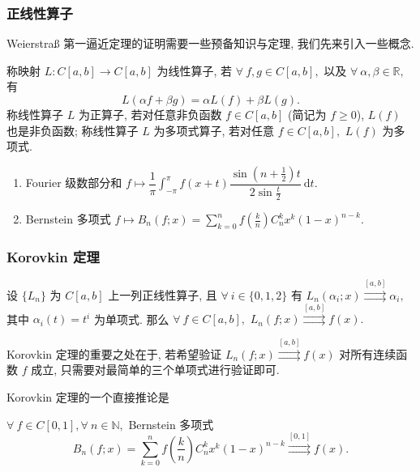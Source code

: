 \begin{frame}
\frametitle{正线性算子}

Weierstraß 第一逼近定理的证明需要一些预备知识与定理, 我们先来引入一些概念.

\pause

\begin{Def}
称映射 $L: C[a,b] \rightarrow C[a,b]$ 为线性算子, 若 $\forall ~ f, g \in C[a,b],$ 以及 $\forall ~ \alpha, \beta \in \mathbb{R},$ 有
\[L(\alpha f + \beta g) = \alpha L(f) + \beta L(g).\]
称线性算子 $L$ 为正算子, 若对任意非负函数 $f \in C[a, b]$ (简记为 $f \geqslant 0$), $L(f)$ 也是非负函数; 称线性算子 $L$ 为多项式算子, 若对任意 $f \in C[a, b],$ $L(f)$ 为多项式.
\end{Def}

\pause

\begin{eg}
\begin{enumerate}
\item Fourier 级数部分和 $\displaystyle f \mapsto \dfrac{1}{\pi}\int_{-\pi}^{\pi} f(x+t) \dfrac{\sin(n+\frac{1}{2})t}{2\sin\frac{t}{2}} ~ \mathrm{d} t.$
\item Bernstein 多项式 $\displaystyle f \mapsto B_n(f; x) = \sum_{k=0}^{n} f \left( \frac{k}{n} \right) C_n^k x^k (1-x)^{n-k}.$
\end{enumerate}
\end{eg}

\end{frame}


\begin{frame}
\frametitle{Korovkin 定理}

\begin{thm}[Korovkin]
设 $\{ L_n \}$ 为 $C[a,b]$ 上一列正线性算子, 且 $\forall ~ i \in \{0, 1, 2\}$ 有 $L_n(\alpha_i; x) \stackrel{[a,b]}{\rightrightarrows} \alpha_i,$ 其中 $\alpha_i(t) = t^i$ 为单项式. 那么 $\forall ~ f \in C[a,b],$ $L_n(f; x) \stackrel{[a,b]}{\rightrightarrows} f(x).$
\end{thm}

Korovkin 定理的重要之处在于, 若希望验证 $L_n(f; x) \stackrel{[a,b]}{\rightrightarrows} f(x)$ 对所有连续函数 $f$ 成立, 只需要对最简单的三个单项式进行验证即可.

\pause
\vspace{1em}

Korovkin 定理的一个直接推论是

\begin{cor}[Bernstein 定理]
$\forall ~ f \in C[0,1], \forall ~ n \in \mathbb{N},$ Bernstein 多项式
\[B_n(f; x) = \sum_{k=0}^{n} f \left( \frac{k}{n} \right) C_n^k x^k (1-x)^{n-k} \stackrel{[0,1]}{\rightrightarrows} f(x).\]
\end{cor}

\end{frame}

